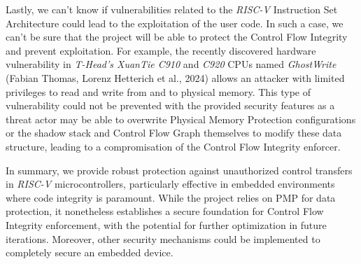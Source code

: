 Lastly, we can't know if vulnerabilities related to the \textit{RISC-V} Instruction
Set Architecture could lead to the exploitation of the user code. In such a case,
we can't be sure that the project will be able to protect the Control Flow Integrity
and prevent exploitation. For example, the recently discovered hardware vulnerability
in \textit{T-Head's XuanTie C910} and \textit{C920} CPUs named \textit{GhostWrite}
(Fabian Thomas, Lorenz Hetterich et al., 2024)\cite{riscvuzz} allows an attacker
with limited privileges to read and write from and to physical memory. This type
of vulnerability could not be prevented with the provided security features as a
threat actor may be able to overwrite Physical Memory Protection configurations or
the shadow stack and Control Flow Graph themselves to modify these data structure,
leading to a compromisation of the Control Flow Integrity enforcer.

In summary, we provide robust protection against unauthorized control transfers in
\textit{RISC-V} microcontrollers, particularly effective in embedded environments
where code integrity is paramount. While the project relies on PMP for data
protection, it nonetheless establishes a secure foundation for Control Flow Integrity
enforcement, with the potential for further optimization in future iterations. Moreover,
other security mechanisms could be implemented to completely secure an embedded
device.
